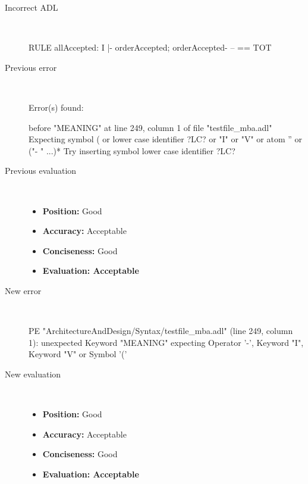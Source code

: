 \hrulefill

\begin{description}
  \item[Incorrect ADL]~\\
\begin{adl}
RULE allAccepted: I |- orderAccepted; orderAccepted- -- == TOT\end{adl}
  \item[Previous error]~\\
\begin{haskell}
Error(s) found:

before "MEANING" at line 249, column 1 of file "testfile_mba.adl"
Expecting symbol ( or lower case identifier ?LC? or "I" or "V" or atom '' or ("-
" ...)*
Try inserting symbol lower case identifier ?LC?
\end{haskell}
  \item[Previous evaluation]~\\
    \begin{itemize}
    \item \textbf{Position:} Good
    \item \textbf{Accuracy:} Acceptable
    \item \textbf{Conciseness:} Good
    \item \textbf{Evaluation: Acceptable}
    \end{itemize}
  \item[New error]~\\
\begin{haskell}
PE "ArchitectureAndDesign/Syntax/testfile_mba.adl" (line 249, column 1):
unexpected Keyword "MEANING"
expecting Operator '-', Keyword "I", Keyword "V" or Symbol '('\end{haskell}
  \item[New evaluation]~\\
    \begin{itemize}
    \item \textbf{Position:} Good
    \item \textbf{Accuracy:} Acceptable
    \item \textbf{Conciseness:} Good
    \item \textbf{Evaluation: Acceptable}
    \end{itemize}
  \end{description}

\hrulefill

